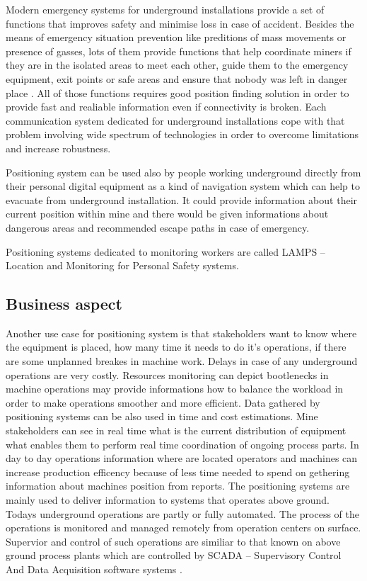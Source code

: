 \documentclass[../main.tex]{subfiles}
\begin{document}
Modern emergency systems for underground installations provide a set of functions that improves safety and minimise loss in case of accident. Besides the means of emergency situation prevention like preditions of mass movements or presence of gasses, lots of them provide functions that help coordinate miners if they are in the isolated areas to meet each other, guide them to the emergency equipment, exit points or safe areas and ensure that nobody was left in danger place \cite{Thesis_CM}. All of those functions requires good position finding solution in order to provide fast and realiable information even if connectivity is broken. Each communication system dedicated for underground installations cope with that problem involving wide spectrum of technologies in order to overcome limitations and increase robustness\cite{article_mine_communications_safety}.

Positioning system can be used also by people working underground directly from their personal digital equipment\cite{Thesis_CM} as a kind of navigation system which can help to evacuate from underground installation. It could provide information about their current position within mine and there would be given informations about dangerous areas and recommended escape paths in case of emergency.

Positioning systems dedicated to monitoring workers are called LAMPS -- Location and Monitoring for Personal Safety systems.

\subsection{Business aspect} %
\label{sub:business_aspect}

Another use case for positioning system is that stakeholders want to know where the equipment is placed, how many time it needs to do it's operations, if there are some unplanned breakes in machine work. Delays in case of any underground operations are very costly. Resources monitoring can depict bootlenecks in machine operations may provide informations how to balance the workload in order to make operations smoother and more efficient. Data gathered by positioning systems can be also used in time and cost estimations. Mine stakeholders can see in real time what is the current distribution of equipment what enables them to perform real time coordination of ongoing process parts. In day to day operations information where are located operators and machines can increase production efficency because of less time needed to spend on gethering information about machines position from reports. \cite{thesis_tablet_positioning} The positioning systems are mainly used to deliver information to systems that operates above ground. Todays underground operations are partly or fully automated. The process of the operations is monitored and managed remotely from operation centers on surface. Supervior and control of such operations are similiar to that known on above ground process plants which are controlled by SCADA -- Supervisory Control And Data Acquisition software systems \cite{Thesis_CM}.
\end{document}
